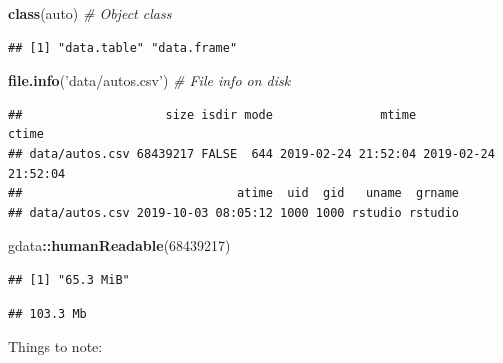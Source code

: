 \documentclass[]{book}
\newenvironment{Shaded}{\begin{snugshade}}{\end{snugshade}}
\newcommand{\CommentTok}[1]{\textcolor[rgb]{0.56,0.35,0.01}{\textit{#1}}}
\newcommand{\DataTypeTok}[1]{\textcolor[rgb]{0.13,0.29,0.53}{#1}}
\newcommand{\DecValTok}[1]{\textcolor[rgb]{0.00,0.00,0.81}{#1}}
\newcommand{\KeywordTok}[1]{\textcolor[rgb]{0.13,0.29,0.53}{\textbf{#1}}}
\newcommand{\NormalTok}[1]{#1}
\newcommand{\OperatorTok}[1]{\textcolor[rgb]{0.81,0.36,0.00}{\textbf{#1}}}
\newcommand{\StringTok}[1]{\textcolor[rgb]{0.31,0.60,0.02}{#1}}
\theoremstyle{definition}
\theoremstyle{definition}
\theoremstyle{definition}
\theoremstyle{remark}
\begin{document}
\begin{Shaded}
\begin{Highlighting}[]
\KeywordTok{class}\NormalTok{(auto) }\CommentTok{# Object class}
\end{Highlighting}
\end{Shaded}

\begin{verbatim}
## [1] "data.table" "data.frame"
\end{verbatim}

\begin{Shaded}
\begin{Highlighting}[]
\KeywordTok{file.info}\NormalTok{(}\StringTok{'data/autos.csv'}\NormalTok{) }\CommentTok{# File info on disk}
\end{Highlighting}
\end{Shaded}

\begin{verbatim}
##                    size isdir mode               mtime               ctime
## data/autos.csv 68439217 FALSE  644 2019-02-24 21:52:04 2019-02-24 21:52:04
##                              atime  uid  gid   uname  grname
## data/autos.csv 2019-10-03 08:05:12 1000 1000 rstudio rstudio
\end{verbatim}

\begin{Shaded}
\begin{Highlighting}[]
\NormalTok{gdata}\OperatorTok{::}\KeywordTok{humanReadable}\NormalTok{(}\DecValTok{68439217}\NormalTok{)}
\end{Highlighting}
\end{Shaded}

\begin{verbatim}
## [1] "65.3 MiB"
\end{verbatim}

\begin{Shaded}
\end{Shaded}

\begin{verbatim}
## 103.3 Mb
\end{verbatim}

Things to note:
\end{document}
